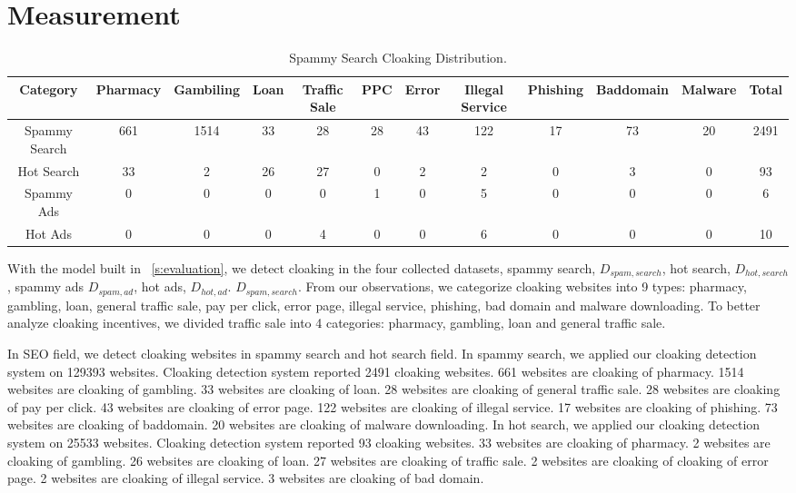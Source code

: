 \section{Measurement}
\label{s:measurement}

\begin{table}
\centering
\begin{center}
\begin{tabular}{c|c|c|c|c|c|c|c|c|c|c|c}
Category & Pharmacy & Gambiling & Loan & Traffic Sale & PPC & Error & Illegal Service & Phishing & Baddomain &  Malware & Total\\
\hline
Spammy Search & 661 & 1514 & 33 & 28 & 28 & 43 & 122 & 17 & 73 & 20 & 2491 \\
Hot Search & 33 & 2 & 26 & 27 & 0 &  2 & 2 & 0 &   3 & 0 & 93\\
Spammy Ads & 0 & 0 & 0 & 0 & 1 & 0 & 5 & 0 & 0 & 0 & 6\\
Hot Ads & 0 & 0 & 0 & 4 & 0 &  0 & 6 & 0 & 0 & 0 & 10\\
\end{tabular}
\end{center}
\caption{Spammy Search Cloaking Distribution.}
\end{table}

With the model built in ~\autoref{s:evaluation}, we detect cloaking in
the four collected datasets, spammy search, $D_{spam, search}$, hot search,
$D_{hot, search}$, spammy ads $D_{spam, ad}$, hot ads, $D_{hot, ad}$. 
$D_{spam, search}$. From our observations, we categorize cloaking websites into 9 types:
pharmacy, gambling, loan, general traffic sale, pay per click, error page, illegal service,
phishing, bad domain and malware downloading. To better analyze cloaking incentives, 
we divided traffic sale into 4 categories: pharmacy, gambling, loan and general traffic sale. 


In SEO field, we detect cloaking websites in spammy search and hot search field. In spammy search,
we applied our cloaking detection system on 129393 websites. Cloaking detection system reported 2491
cloaking websites. 661 websites are cloaking of pharmacy. 1514 websites are cloaking of gambling.
33 websites are cloaking of loan. 28 websites are cloaking of general traffic sale. 28 websites are cloaking
of pay per click. 43 websites are cloaking of error page. 122 websites are cloaking of illegal service. 
17 websites are cloaking of phishing. 73 websites are cloaking of baddomain. 20 websites are cloaking of malware downloading.
In hot search, we applied our cloaking detection system on 25533 websites. Cloaking detection system reported 93
cloaking websites. 33 websites are cloaking of pharmacy. 2 websites are cloaking of gambling.
26 websites are cloaking of loan. 27 websites are cloaking of traffic sale. 2 websites are cloaking of cloaking of
error page. 2 websites are cloaking of illegal service. 3 websites are cloaking of bad domain. 

